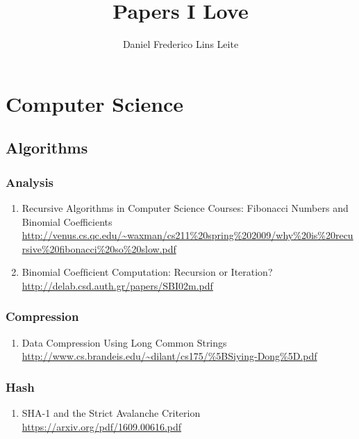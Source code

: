 \documentclass{article}
\begin{document}
\title{Papers I Love}
\author{Daniel Frederico Lins Leite}

\maketitle

\tableofcontents

\section{Computer Science}



\subsection{Algorithms}

\subsubsection{Analysis}
\begin{enumerate}
	\item {Recursive Algorithms in Computer Science Courses: Fibonacci Numbers and Binomial Coefficients\\
\url{http://venus.cs.qc.edu/~waxman/cs211%20spring%202009/why%20is%20recursive%20fibonacci%20so%20slow.pdf}}
	\item {Binomial Coefﬁcient Computation: Recursion or Iteration?\\
\url{http://delab.csd.auth.gr/papers/SBI02m.pdf}}
	
\end{enumerate}

\subsubsection{Compression}
\begin{enumerate}
\item {Data Compression Using Long Common Strings\\
\url{http://www.cs.brandeis.edu/~dilant/cs175/%5BSiying-Dong%5D.pdf}}
\end{enumerate}

\subsubsection{Hash}
\begin{enumerate}
	\item {SHA-1 and the Strict Avalanche Criterion\\
\url{https://arxiv.org/pdf/1609.00616.pdf}}
\end{enumerate}
\end{document}
